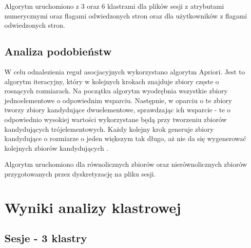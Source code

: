 \documentclass{classrep}
\begin{document}
    Algorytm uruchomiono z 3 oraz 6 klastrami dla plików sesji z atrybutami numerycznymi oraz flagami odwiedzonych stron oraz dla użytkowników z flagami odwiedzonych stron.

    \subsection{Analiza podobieństw}

    W celu odnalezienia reguł asocjacyjnych wykorzystano algorytm Apriori. Jest to algorytm iteracyjny, który w kolejnych krokach znajduje zbiory częste o rosnących rozmiarach. Na początku algorytm wyodrębnia wszystkie zbiory jednoelementowe o odpowiednim wsparciu. Następnie, w oparciu o te zbiory tworzy zbiory kandydujące dwuelementowe, sprawdzając ich wsparcie - te o odpowiednio wysokiej wartości wykorzystane będą przy tworzeniu zbiorów kandydujących trójelementowych. Każdy kolejny krok generuje zbiory kandydujące o rozmiarze o jeden większym tak długo, aż nie da się wygenerować kolejnych zbiorów kandydujących \cite{Apriori}.
    
    Algorytm uruchomiono dla równolicznych zbiorów oraz nierównolicznych zbiorów przygotowanych przez dyskretyzację na pliku sesji.

\newpage

\section{Wyniki analizy klastrowej}

    \subsection{Sesje - 3 klastry}

    
\end{document}
